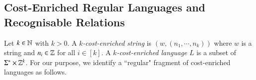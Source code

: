 


\subsection{Cost-Enriched Regular Languages and Recognisable Relations} \label{sect:ce}

Let $k \in \mathbb{N}$ with $k > 0$. A \emph{$k$-cost-enriched string} is $(w, (n_1, \cdots, n_k))$ where $w$ is a string and $n_i \in \mathbb{Z}$ for all $i \in [k]$. 
A \emph{$k$-cost-enriched language} $L$ is a subset of $\Sigma^* \times \mathbb{Z}^k$. For our purpose, we identify a ``regular" fragment of cost-enriched languages as follows. 

